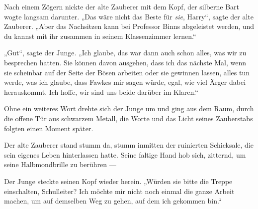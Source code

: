 Nach einem Zögern nickte der alte Zauberer mit dem Kopf, der silberne Bart wogte langsam darunter.
„Das wäre nicht das Beste für \emph{sie}, Harry“, sagte der alte Zauberer.
„Aber das Nachsitzen kann bei Professor Binns abgeleistet werden, und du kannst mit ihr zusammen in seinem Klassenzimmer lernen.“

„Gut“, sagte der Junge.
„Ich glaube, das war dann auch schon alles, was wir zu besprechen hatten. Sie können davon ausgehen, dass ich das nächste Mal, wenn sie scheinbar auf der Seite der Bösen arbeiten oder sie gewinnen lassen, alles tun werde, was ich glaube, dass Fawkes mir sagen würde, egal, wie viel Ärger dabei herauskommt. Ich hoffe, wir sind uns beide darüber im Klaren.“

Ohne ein weiteres Wort drehte sich der Junge um und ging aus dem Raum, durch die offene Tür aus schwarzem Metall, die Worte  und das Licht seines Zauberstabs folgten einen Moment später.

Der alte Zauberer stand stumm da, stumm inmitten der ruinierten Schicksale, die sein eigenes Leben hinterlassen hatte. Seine faltige Hand hob sich, zitternd, um seine Halbmondbrille zu berühren —

Der Junge steckte seinen Kopf wieder herein.
„Würden sie bitte die Treppe einschalten, Schulleiter? Ich möchte mir nicht noch einmal die ganze Arbeit machen, um auf demselben Weg zu gehen, auf dem ich gekommen bin.“

